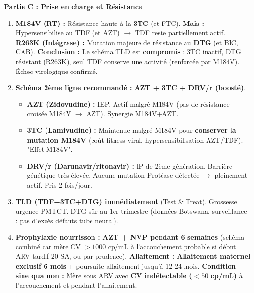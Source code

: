 \documentclass[11pt]{article}
\begin{document}
\begin{corrige}
\textbf{Partie C : Prise en charge et Résistance}
\begin{enumerate}
\item[a)] \textbf{M184V (RT) :} Résistance haute à la \textbf{3TC} (et FTC). \textbf{Mais :} Hypersensibilise au TDF (et AZT) $\to$ TDF reste partiellement actif. \textbf{R263K (Intégrase) :} Mutation majeure de résistance au \textbf{DTG} (et BIC, CAB). \textbf{Conclusion :} Le schéma TLD est \textbf{compromis} : 3TC inactif, DTG résistant (R263K), seul TDF conserve une activité (renforcée par M184V). Échec virologique confirmé.
\item[b)] \textbf{Schéma 2ème ligne recommandé :} \textbf{AZT + 3TC + DRV/r (boosté)}.
\begin{itemize}
\item \textbf{AZT (Zidovudine) :} IEP. Actif malgré M184V (pas de résistance croisée M184V $\to$ AZT). Synergie M184V+AZT.
\item \textbf{3TC (Lamivudine) :} Maintenue malgré M184V pour \textbf{conserver la mutation M184V} (coût fitness viral, hypersensibilisation AZT/TDF). "Effet M184V".
\item \textbf{DRV/r (Darunavir/ritonavir) :} IP de 2ème génération. Barrière génétique très élevée. Aucune mutation Protéase détectée $\to$ pleinement actif. Pris 2 fois/jour.
\end{itemize}
\item[a)] \textbf{TLD (TDF+3TC+DTG) immédiatement} (Test \& Treat). Grossesse = urgence PMTCT. DTG sûr au 1er trimestre (données Botswana, surveillance : pas d'excès défauts tube neural).
\item[b)] \textbf{Prophylaxie nourrisson :} \textbf{AZT + NVP pendant 6 semaines} (schéma combiné car mère CV $> 1000$ cp/mL à l'accouchement probable si début ARV tardif 20 SA, ou par prudence). \textbf{Allaitement :} \textbf{Allaitement maternel exclusif 6 mois} + poursuite allaitement jusqu'à 12-24 mois. \textbf{Condition sine qua non :} Mère sous ARV avec \textbf{CV indétectable ($< 50$ cp/mL)} à l'accouchement et pendant l'allaitement.
\end{enumerate}


\end{corrige}
\end{document}
